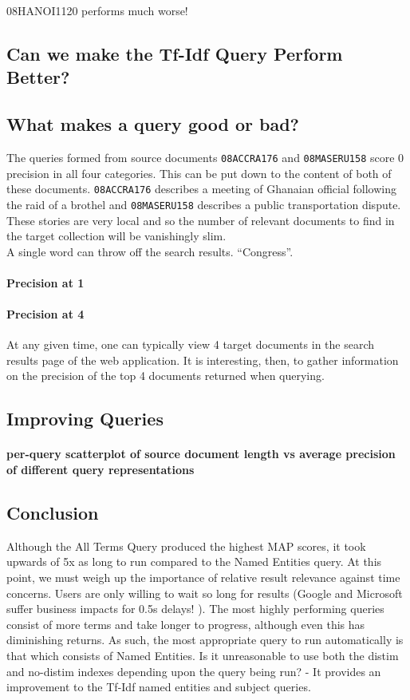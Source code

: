 \documentclass{l4proj}
\newcommand{\code}[1]{\texttt{#1}}
\begin{document}
08HANOI1120 performs much worse!

\subsection{Can we make the Tf-Idf Query Perform Better?}
\subsection{What makes a query good or bad?}
The queries formed from source documents \code{08ACCRA176} and \code{08MASERU158} score 0 precision in all four categories. This can be put down to the content of both of these documents. \code{08ACCRA176} describes a meeting of Ghanaian official following the raid of a brothel and \code{08MASERU158} describes a public transportation dispute. These stories are very local and so the number of relevant documents to find in the target collection will be vanishingly slim. \\
A single word can throw off the search results. ``Congress''. \\

\paragraph{Precision at 1}
\paragraph{Precision at 4}
At any given time, one can typically view 4 target documents in the search results page of the web application. It is interesting, then, to gather information on the precision of the top 4 documents returned when querying.
\subsection{Improving Queries}
\paragraph{per-query scatterplot of source document length vs average precision of different query representations}

\subsection{Conclusion}
Although the All Terms Query produced the highest MAP scores, it took upwards of 5x as long to run compared to the Named Entities query. At this point, we must weigh up the importance of relative result relevance against time concerns. Users are only willing to wait so long for results (Google and Microsoft suffer business impacts for 0.5s delays! \cite{performance}). The most highly performing queries consist of more terms and take longer to progress, although even this has diminishing returns.
As such, the most appropriate query to run automatically is that which consists of Named Entities.
Is it unreasonable to use both the distim and no-distim indexes depending upon the query being run? - It provides an improvement to the Tf-Idf named entities and subject queries.
\end{document}
